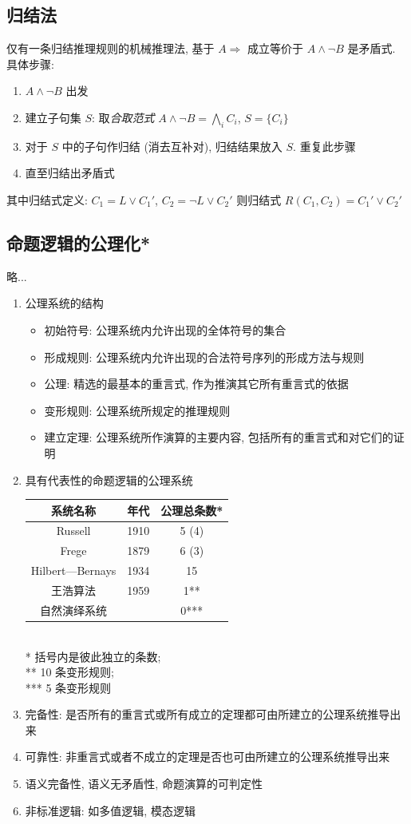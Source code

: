\documentclass[11pt,a4paper,twocolumn,fleqn]{article} %
\begin{document}
\subsection{归结法} %
\label{sub:resolution}
仅有一条归结推理规则的机械推理法, 基于 $A\Rightarrow$ 成立等价于
$A\land \lnot B$ 是矛盾式. 具体步骤:
\begin{enumerate}
	\item $A\land \lnot B$ 出发
	\item 建立子句集 $S$: 取\emph{合取范式} $A\land \lnot B = \bigwedge_i C_i$, 
	$S = \{C_i\}$
	\item 对于 $S$ 中的子句作归结 (消去互补对), 归结结果放入 $S$. 重复此步骤
	\item 直至归结出矛盾式
\end{enumerate}
其中归结式定义: $C_1 = L\lor C_1'$, $C_2 = \lnot L \lor C_2'$ 则归结式 
$R(C_1, C_2) = C_1' \lor C_2'$
\subsection{命题逻辑的公理化*} %
\label{sub:axiomatization}
略...
\begin{enumerate}
	\item 公理系统的结构
	\begin{itemize}
		\item 初始符号: 公理系统内允许出现的全体符号的集合
		\item 形成规则: 公理系统内允许出现的合法符号序列的形成方法与规则
		\item 公理: 精选的最基本的重言式, 作为推演其它所有重言式的依据
		\item 变形规则: 公理系统所规定的推理规则
		\item 建立定理: 公理系统所作演算的主要内容, 
		包括所有的重言式和对它们的证明
	\end{itemize}
	\item 具有代表性的命题逻辑的公理系统\\
	\begin{tabular}{c|cc}
	系统名称 & 年代 & 公理总条数* \\\hline
	Russell          & 1910 & 5 (4) \\
	Frege            & 1879 & 6 (3) \\
	Hilbert—Bernays  & 1934 & 15 \\
	王浩算法         & 1959 & 1** \\
	自然演绎系统     &      & 0***
	\end{tabular}\\
	* 括号内是彼此独立的条数; \\
	** 10 条变形规则; \\
	*** 5 条变形规则
	\item 完备性: 是否所有的重言式或所有成立的定理都可由所建立的公理系统推导出来
	\item 可靠性: 非重言式或者不成立的定理是否也可由所建立的公理系统推导出来
	\item 语义完备性, 语义无矛盾性, 命题演算的可判定性
	\item 非标准逻辑: 如多值逻辑, 模态逻辑
\end{enumerate}
\end{document}
